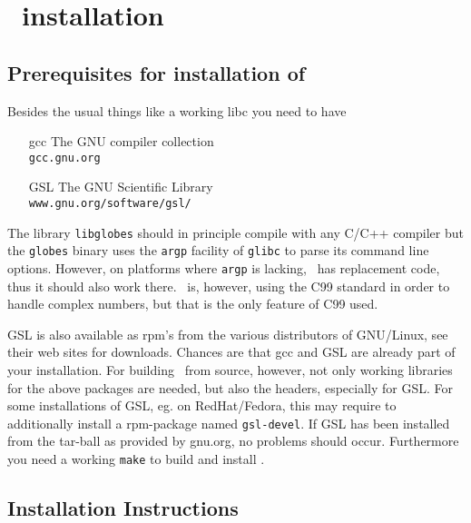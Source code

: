 
\appendix
\chapter{\GLOBES\ installation}
\label{app:installation}

\section{Prerequisites for installation of \GLOBES}

Besides the usual things like a working libc you need to have
 \begin{itemize}
        \item[gcc]      The GNU compiler collection\\
                        \verb+gcc.gnu.org+
        \item[GSL]      The GNU Scientific Library\\
                        \verb+www.gnu.org/software/gsl/+
\end{itemize}
The library \verb+libglobes+ should in principle compile with any C/C++
compiler but the \verb+globes+ binary uses the \verb+argp+ facility of \verb+glibc+
to parse its command line options. However, on platforms where \verb+argp+
is lacking, \GLOBES\ has replacement code, thus it should also work
there. \GLOBES\ is, however, using the C99 standard in order to handle
complex numbers, but that is the only feature of C99 used.

GSL is also available as rpm's from the various distributors of
GNU/Linux, see their web sites for downloads. Chances are that gcc and
GSL are already part of your installation.  For building \GLOBES\ from
source, however, not only working libraries for the above packages are
needed, but also the headers, especially for GSL. For some installations
of GSL, eg. on RedHat/Fedora, this may require to
additionally install a rpm-package named \verb+gsl-devel+. If GSL has been
installed from the tar-ball as provided by gnu.org, no problems should
occur. Furthermore you need a working \verb+make+ to build and install
\GLOBES.


\section{Installation Instructions}



